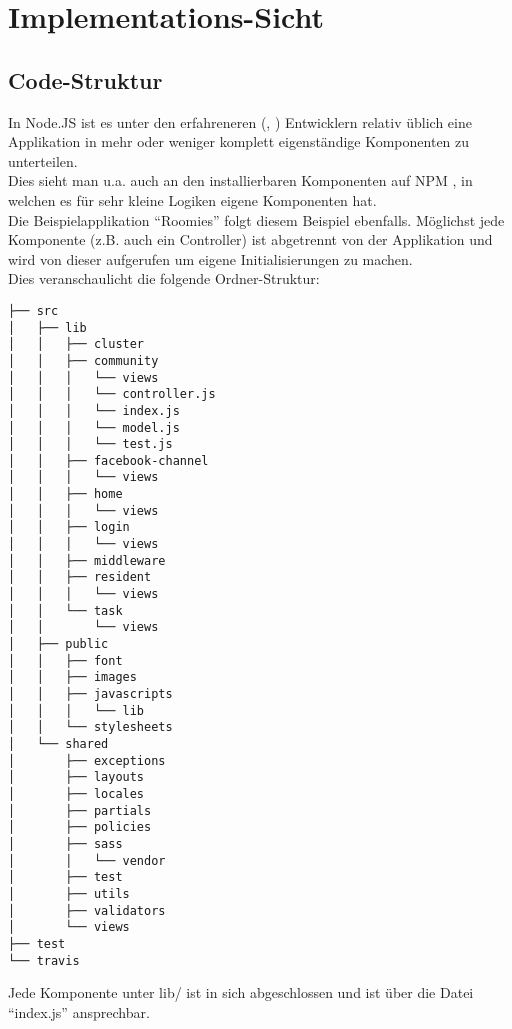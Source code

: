 \section{Implementations-Sicht}
\subsection{Code-Struktur}
In Node.JS ist es unter den erfahreneren (\cite{TJH_ComponentStructure}, \cite{IZS_ComponentStructure}) Entwicklern relativ üblich eine Applikation in mehr oder weniger komplett eigenständige Komponenten zu unterteilen.\\
Dies sieht man u.a. auch an den installierbaren Komponenten auf NPM \cite{NPM}, in welchen es für sehr kleine Logiken eigene Komponenten hat.\\
Die Beispielapplikation ``Roomies'' folgt diesem Beispiel ebenfalls. Möglichst jede Komponente (z.B. auch ein Controller) ist abgetrennt von der Applikation und wird von dieser aufgerufen um eigene Initialisierungen zu machen.\\[0.5mm]

Dies veranschaulicht die folgende Ordner-Struktur:
\begin{verbatim}
├── src
│   ├── lib
│   │   ├── cluster
│   │   ├── community
│   │   │   └── views
│   │   │   └── controller.js
│   │   │   └── index.js
│   │   │   └── model.js
│   │   │   └── test.js
│   │   ├── facebook-channel
│   │   │   └── views
│   │   ├── home
│   │   │   └── views
│   │   ├── login
│   │   │   └── views
│   │   ├── middleware
│   │   ├── resident
│   │   │   └── views
│   │   └── task
│   │       └── views
│   ├── public
│   │   ├── font
│   │   ├── images
│   │   ├── javascripts
│   │   │   └── lib
│   │   └── stylesheets
│   └── shared
│       ├── exceptions
│       ├── layouts
│       ├── locales
│       ├── partials
│       ├── policies
│       ├── sass
│       │   └── vendor
│       ├── test
│       ├── utils
│       ├── validators
│       └── views
├── test
└── travis
\end{verbatim}

Jede Komponente unter lib/ ist in sich abgeschlossen und ist über die Datei ``index.js''
ansprechbar.